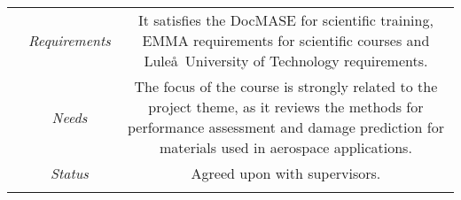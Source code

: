 \begin{table}
\begin{tabularx}{\textwidth}{cccccc}
    \fi
    &\textit{Requirements}&\multicolumn{4}{p{0.7\textwidth}}{It satisfies the DocMASE for scientific training, EMMA requirements for scientific courses and Lule\aa\ University of Technology requirements.}\\
    &\textit{Needs}&\multicolumn{4}{p{0.7\textwidth}}{The focus of the course is strongly related to the project theme, as it reviews the methods for performance assessment and damage prediction for materials used in aerospace applications.}\\
    &\textit{Status}&\multicolumn{4}{p{0.7\textwidth}}{Agreed upon with supervisors.}\\
    \midrule
    \bottomrule
\label{tab:proposal_tab1} 
\end{tabularx}
\end{table}
